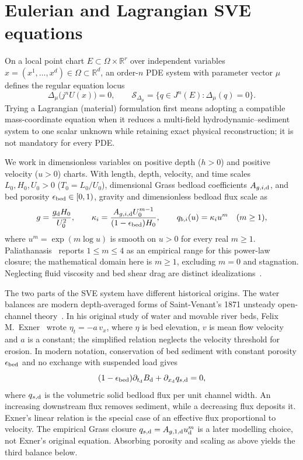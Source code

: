 \documentclass[12pt,a4paper,oneside]{report}
\numberwithin{equation}{chapter}
\theoremstyle{definition}
\theoremstyle{remark}\newtheorem{remark}[theorem]{Remark}
\begin{document}
\section{Eulerian and Lagrangian SVE equations}\label{sec:physical-models}

On a local point chart $E\subset\Omega\times\mathbb R^r$ over independent variables $x=(x^1,\ldots,x^d)\in\Omega\subset\mathbb R^d$, an order-$n$ PDE system with parameter vector $\mu$ defines the regular equation locus
\[
 \Delta_\mu\bigl(j^n U(x)\bigr)=0,\qquad \mathcal S_{\Delta_\mu}=\bigl\{q\in J^n(E):\Delta_\mu(q)=0\bigr\}.
\]
Trying a Lagrangian (material) formulation first means adopting a compatible mass-coordinate equation when it reduces a multi-field hydrodynamic--sediment system to one scalar unknown while retaining exact physical reconstruction; it is not mandatory for every PDE.

We work in dimensionless variables on positive depth ($h>0$) and positive velocity ($u>0$) charts. With length, depth, velocity, and time scales $L_0,H_0,U_0>0$ ($T_0=L_0/U_0$), dimensional Grass bedload coefficients $A_{g,i,\rm d}$, and bed porosity $\epsilon_{\rm bed}\in[0,1)$, gravity and dimensionless bedload flux scale as
\begin{equation}\label{eq:dimensionless-params}
 g=\frac{g_{\rm d}H_0}{U_0^2},\qquad
 \kappa_i=\frac{A_{g,i,\rm d}U_0^{m-1}}{(1-\epsilon_{\rm bed})H_0},\qquad
 q_{b,i}(u)=\kappa_i u^m \quad (m\ge 1),
\end{equation}
where $u^m=\exp(m\log u)$ is smooth on $u>0$ for every real $m\ge1$. Paliathanasis~\cite{sve2022} reports $1\le m\le4$ as an empirical range for this power-law closure; the mathematical domain here is $m\ge1$, excluding $m=0$ and stagnation. Neglecting fluid viscosity and bed shear drag are distinct idealizations~\cite{fernandez2017}.

The two parts of the SVE system have different historical origins. The water balances are modern depth-averaged forms of Saint-Venant's 1871 unsteady open-channel theory~\cite{saintvenant1871}. In his original study of water and movable river beds, Felix M.\ Exner~\cite[p.~167, Eq.~(1)]{exner1925} wrote $\eta_t=-a\,v_x$, where $\eta$ is bed elevation, $v$ is mean flow velocity and $a$ is a constant; the simplified relation neglects the velocity threshold for erosion. In modern notation, conservation of bed sediment with constant porosity $\epsilon_{\rm bed}$ and no exchange with suspended load gives~\cite{paola2005,berthon2012}
\[
 (1-\epsilon_{\rm bed})\partial_{t_{\rm d}} B_{\rm d}
 +\partial_{x_{\rm d}}q_{s,\rm d}=0,
\]
where $q_{s,\rm d}$ is the volumetric solid bedload flux per unit channel width. An increasing downstream flux removes sediment, while a decreasing flux deposits it. Exner's linear relation is the special case of an effective flux proportional to velocity. The empirical Grass closure $q_{s,\rm d}=A_{g,1,\rm d}u_{\rm d}^m$ is a later modelling choice, not Exner's original equation. Absorbing porosity and scaling as above yields the third balance below.
\end{document}
